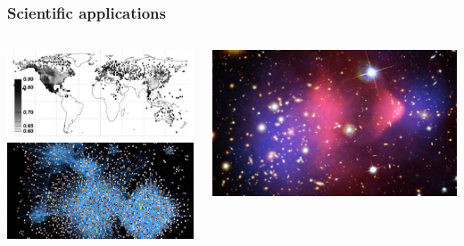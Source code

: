 \documentclass{beamer}
\begin{document}

 \begin{frame}
   \frametitle{Scientific applications}
   \centering
   \begin{columns}
     \begin{column}{0.5\textwidth}
       \centering
       \includegraphics[width=0.8\columnwidth]{figures/climate.jpg}\\
       \includegraphics[width=\columnwidth]{figures/networks-2.jpg}
     \end{column}
     \begin{column}{0.5\textwidth}
       \includegraphics[width=\columnwidth]{figures/dark_matter.jpg}

\end{column}
\end{columns}
\end{frame}
\end{document}
